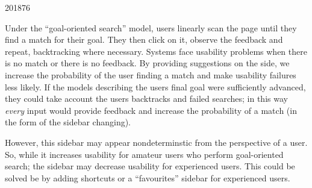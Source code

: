 \documentclass[10pt,\jkfside,a4paper]{article}
\begin{document}
\begin{examquestion}{2018}{7}{6}
\begin{enumerate}
Under the ``goal-oriented search'' model, users linearly scan the page until
they find a match for their goal. They then click on it, observe the feedback
and repeat, backtracking where necessary. Systems face usability problems when
there is no match or there is no feedback. By providing suggestions on the
side, we increase the probability of the user finding a match and make
usability failures less likely. If the models describing the users final
goal were sufficiently advanced, they could take account the users
backtracks and failed searches; in this way \textit{every} input
would provide feedback and increase the probability of a match (in the form of
the sidebar changing).

However, this sidebar may appear nondeterminstic from the perspective of a
user. So, while it increases usability for amateur users who perform
goal-oriented search; the sidebar may decrease usability for experienced
users. This could be solved be by adding shortcuts or a ``favourites''
sidebar for experienced users.

\end{enumerate}

\end{examquestion}
\end{document}
